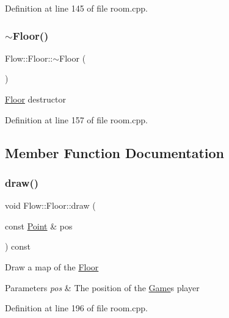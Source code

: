 Definition at line 145 of file room.\+cpp.

\hypertarget{class_flow_1_1_floor_abcb53e88835e043390289c0aac035ac0}{}\label{class_flow_1_1_floor_abcb53e88835e043390289c0aac035ac0} 
\subsubsection{\texorpdfstring{$\sim$\+Floor()}{~Floor()}}
{\footnotesize\ttfamily Flow\+::\+Floor\+::$\sim$\+Floor (\begin{DoxyParamCaption}{ }\end{DoxyParamCaption})}

\hyperlink{class_flow_1_1_floor}{Floor} destructor 

Definition at line 157 of file room.\+cpp.



\subsection{Member Function Documentation}
\hypertarget{class_flow_1_1_floor_a7fedee1db9c05420cc75bee81c3be0b6}{}\label{class_flow_1_1_floor_a7fedee1db9c05420cc75bee81c3be0b6} 
\subsubsection{\texorpdfstring{draw()}{draw()}}
{\footnotesize\ttfamily void Flow\+::\+Floor\+::draw (\begin{DoxyParamCaption}\item[{const \hyperlink{struct_flow_1_1_point}{Point} \&}]{pos }\end{DoxyParamCaption}) const}

Draw a map of the \hyperlink{class_flow_1_1_floor}{Floor} 
\begin{DoxyParams}{Parameters}
{\em pos} & The position of the \hyperlink{class_flow_1_1_game}{Game}\textquotesingle{}s player \\
\hline
\end{DoxyParams}


Definition at line 196 of file room.\+cpp.

\hypertarget{class_flow_1_1_floor_a9cab7af772e3b3a12f289b0942e870f1}{}\label{class_flow_1_1_floor_a9cab7af772e3b3a12f289b0942e870f1} 
